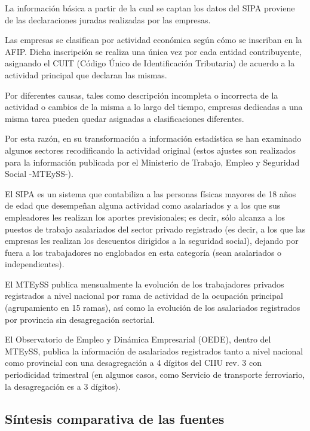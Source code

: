 \documentclass[
  openany]{book}
\begin{document}
La información básica a partir de la cual se captan los datos del SIPA proviene de las declaraciones juradas realizadas por las empresas.

Las empresas se clasifican por actividad económica según cómo se inscriban en la AFIP.
Dicha inscripción se realiza una única vez por cada entidad contribuyente, asignando el CUIT (Código Único de Identificación Tributaria) de acuerdo a la actividad principal que declaran las mismas.

Por diferentes causas, tales como descripción incompleta o incorrecta de la actividad o cambios de la misma a lo largo del tiempo, empresas dedicadas a una misma tarea pueden quedar asignadas a clasificaciones diferentes.

Por esta razón, en su transformación a información estadística se han examinado algunos sectores recodificando la actividad original (estos ajustes son realizados para la información publicada por el Ministerio de Trabajo, Empleo y Seguridad Social -MTEySS-).

El SIPA es un sistema que contabiliza a las personas físicas mayores de 18 años de edad que desempeñan alguna actividad como asalariados y a los que sus empleadores les realizan los aportes previsionales; es decir, sólo alcanza a los puestos de trabajo asalariados del sector privado registrado (es decir, a los que las empresas les realizan los descuentos dirigidos a la seguridad social), dejando por fuera a los trabajadores no englobados en esta categoría (sean asalariados o independientes).

El MTEySS publica mensualmente la evolución de los trabajadores privados registrados a nivel nacional por rama de actividad de la ocupación principal (agrupamiento en 15 ramas), así como la evolución de los asalariados registrados por provincia sin desagregación sectorial.

El Observatorio de Empleo y Dinámica Empresarial (OEDE), dentro del MTEySS, publica la información de asalariados registrados tanto a nivel nacional como provincial con una desagregación a 4 dígitos del CIIU rev. 3 con periodicidad trimestral (en algunos casos, como Servicio de transporte ferroviario, la desagregación es a 3 dígitos).

\hypertarget{suxedntesis-comparativa-de-las-fuentes}{%
\subsection{Síntesis comparativa de las fuentes}\label{suxedntesis-comparativa-de-las-fuentes}}
\end{document}
